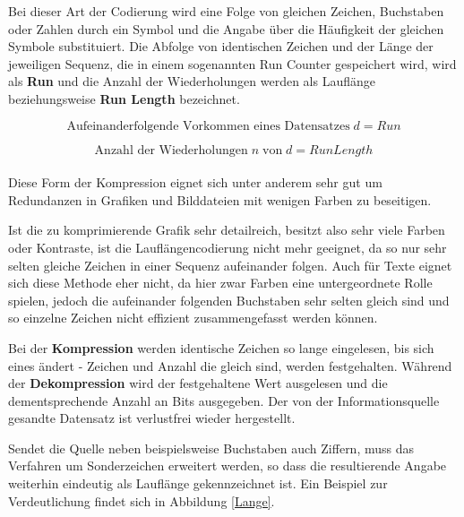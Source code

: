 \documentclass[11pt,a4paper,ngerman]{report}
\begin{document}
  		  
  		  Bei dieser Art der Codierung wird eine Folge von gleichen Zeichen, Buchstaben oder Zahlen durch ein Symbol und die Angabe über die Häufigkeit der gleichen Symbole substituiert. Die Abfolge von identischen Zeichen und der Länge der jeweiligen Sequenz, die in einem sogenannten Run Counter gespeichert wird, wird als \textbf{Run}  und die Anzahl der Wiederholungen werden als Lauflänge beziehungsweise \textbf{Run Length} bezeichnet.
  		  
  		  \begin{equation}
  		  	\text{Aufeinanderfolgende Vorkommen eines Datensatzes} \; d = Run
  		  \end{equation}
  	  
  	      \begin{equation}
  	  	    \text{Anzahl der Wiederholungen} \; n \;\text{von} \; d = RunLength
  	      \end{equation}
  	      \\
  	      Diese Form der Kompression eignet sich unter anderem sehr gut um Redundanzen in Grafiken und Bilddateien mit wenigen Farben zu beseitigen.
  	  
  		  Ist die zu komprimierende Grafik sehr detailreich, besitzt also sehr viele Farben oder Kontraste, ist die Lauflängencodierung nicht mehr geeignet,  da so nur sehr selten gleiche Zeichen in einer Sequenz aufeinander folgen.\cite{ITWissen.info} Auch für Texte eignet sich diese Methode eher nicht, da hier zwar Farben eine untergeordnete Rolle spielen, jedoch die aufeinander folgenden Buchstaben sehr selten gleich sind und so einzelne Zeichen nicht effizient zusammengefasst werden können.\cite[Seite 61]{Lange2021}
  		  
  		  Bei der \textbf{Kompression} werden identische Zeichen so lange eingelesen, bis sich eines ändert - Zeichen und Anzahl die gleich sind, werden festgehalten. Während der \textbf{Dekompression} wird der festgehaltene Wert ausgelesen und die dementsprechende Anzahl an Bits ausgegeben.\cite{ITWissen.info} Der von der Informationsquelle gesandte Datensatz ist verlustfrei wieder hergestellt.
  		  
  		  Sendet die Quelle neben beispielsweise Buchstaben auch Ziffern, muss das Verfahren um Sonderzeichen erweitert werden, so dass die resultierende Angabe weiterhin eindeutig als Lauflänge gekennzeichnet ist. \cite[Seite 62]{Lange2021} Ein Beispiel zur Verdeutlichung findet sich in Abbildung \ref{Lange}.
  		  
\end{document}
